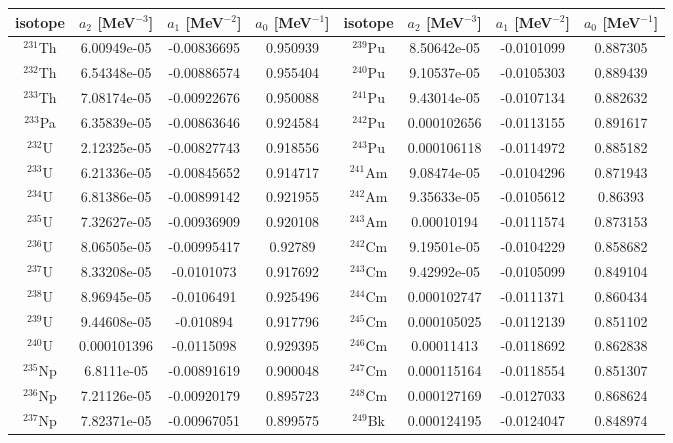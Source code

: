 \begin{table}[ht]
\footnotesize
\begin{center}
\begin{tabular}{|c|c|c|c||c|c|c|c|} \hline
isotope & $a_2$ [MeV$^{-3}$] & $a_1$ [MeV$^{-2}$] & $a_0$ [MeV$^{-1}$] & isotope & $a_2$ [MeV$^{-3}$] & $a_1$ [MeV$^{-2}$] & $a_0$ [MeV$^{-1}$] \\ \hline
$^{231}$Th & 6.00949e-05 & -0.00836695 & 0.950939 & $^{239}$Pu & 8.50642e-05 & -0.0101099 & 0.887305 \\
$^{232}$Th & 6.54348e-05 & -0.00886574 & 0.955404 & $^{240}$Pu & 9.10537e-05 & -0.0105303 & 0.889439 \\
$^{233}$Th & 7.08174e-05 & -0.00922676 & 0.950088 & $^{241}$Pu & 9.43014e-05 & -0.0107134 & 0.882632 \\
$^{233}$Pa & 6.35839e-05 & -0.00863646 & 0.924584 & $^{242}$Pu & 0.000102656 & -0.0113155 & 0.891617 \\
$^{232}$U & 2.12325e-05 & -0.00827743 & 0.918556 & $^{243}$Pu & 0.000106118 & -0.0114972 & 0.885182 \\
$^{233}$U & 6.21336e-05 & -0.00845652 & 0.914717 & $^{241}$Am & 9.08474e-05 & -0.0104296 & 0.871943 \\
$^{234}$U & 6.81386e-05 & -0.00899142 & 0.921955 & $^{242}$Am & 9.35633e-05 & -0.0105612 & 0.86393 \\
$^{235}$U & 7.32627e-05 & -0.00936909 & 0.920108 & $^{243}$Am & 0.00010194 & -0.0111574 & 0.873153 \\
$^{236}$U & 8.06505e-05 & -0.00995417 & 0.92789 & $^{242}$Cm & 9.19501e-05 & -0.0104229 & 0.858682 \\
$^{237}$U & 8.33208e-05 & -0.0101073 & 0.917692 & $^{243}$Cm & 9.42992e-05 & -0.0105099 & 0.849104 \\
$^{238}$U & 8.96945e-05 & -0.0106491 & 0.925496 & $^{244}$Cm & 0.000102747 & -0.0111371 & 0.860434 \\
$^{239}$U & 9.44608e-05 & -0.010894 & 0.917796 & $^{245}$Cm & 0.000105025 & -0.0112139 & 0.851102 \\
$^{240}$U & 0.000101396 & -0.0115098 & 0.929395 & $^{246}$Cm & 0.00011413 & -0.0118692 & 0.862838 \\
$^{235}$Np & 6.8111e-05 & -0.00891619 & 0.900048 & $^{247}$Cm & 0.000115164 & -0.0118554 & 0.851307 \\
$^{236}$Np & 7.21126e-05 & -0.00920179 & 0.895723 & $^{248}$Cm & 0.000127169 & -0.0127033 & 0.868624 \\
$^{237}$Np & 7.82371e-05 & -0.00967051 & 0.899575 & $^{249}$Bk & 0.000124195 & -0.0124047 & 0.848974 \\

\end{tabular}
\end{center}
\end{table}

